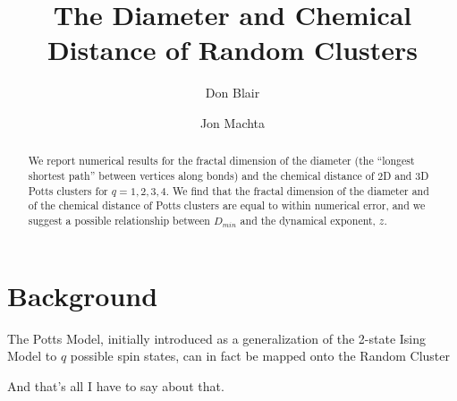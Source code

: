 \documentclass[aps, twocolumn, groupedaddress]{revtex4}
\begin{document}
\title{The Diameter and Chemical Distance of Random Clusters}

\author{Don Blair}
\author{Jon Machta}
\begin{abstract}

We report numerical results for the fractal dimension of the diameter (the ``longest shortest path'' between vertices along bonds) and the chemical distance of 2D and 3D Potts clusters for $q=1,2,3,4$.  We find that the fractal dimension of the diameter and of the chemical distance of Potts clusters are equal to within numerical error, and we suggest a possible relationship between $D_{min}$ and the dynamical exponent, $z$.

\end{abstract}

\maketitle

\section{Background}


The Potts Model, initially introduced as a generalization of the 2-state Ising Model to $q$ possible spin states, can in fact be mapped onto the Random Cluster 


And that's all I have to say about that.
\end{document}
